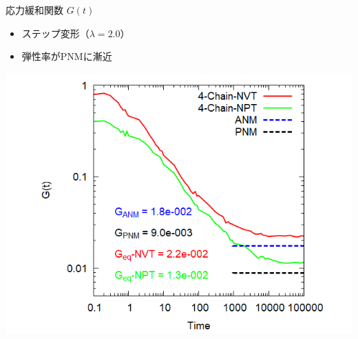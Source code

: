 \documentclass[12pt, dvipdfmx]{beamer}
\begin{document}
\begin{frame}
\begin{columns}[T, onlytextwidth]
			\begin{block}{応力緩和関数 $G(t)$}
				\begin{itemize}
					\item ステップ変形（$\lambda=2.0$）
					\item 弾性率がPNMに漸近
				\end{itemize}
				\vspace{6mm}
					\includegraphics[width=\textwidth]{gt_4chain_comp.png}
				\end{block}
		\end{columns}
\end{frame}
\end{document}
